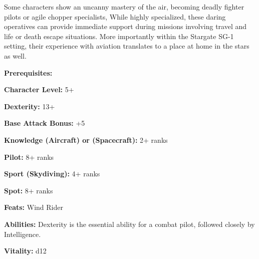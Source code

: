 \begin{multicols}{2}

Some characters show an uncanny mastery of the air, becoming deadly fighter pilots or agile chopper specialists, While highly specialized, these daring operatives can provide immediate support during missions involving travel and life or death escape situations. More importantly within the Stargate SG-1 setting, their experience with aviation translates to a place at home in the stars as well.

\columnbreak

\textbf{Prerequisites:} 
\begin{description*}
\item[\hspace{1.5cm}\textbf{Character Level:}] 5+
\item[\hspace{1.5cm}\textbf{Dexterity:}] 13+
\item[\hspace{1.5cm}\textbf{Base Attack Bonus:}] +5
\item[\hspace{1.5cm}\textbf{Knowledge (Aircraft) or (Spacecraft):}] 2+ ranks
\item[\hspace{1.5cm}\textbf{Pilot:}] 8+ ranks
\item[\hspace{1.5cm}\textbf{Sport (Skydiving):}] 4+ ranks
\item[\hspace{1.5cm}\textbf{Spot:}] 8+ ranks
\item[\hspace{1.5cm}\textbf{Feats:}] Wind Rider
\end{description*}

\textbf{Abilities:} Dexterity is the essential ability for a combat pilot, followed closely by Intelligence.

\textbf{Vitality:} d12

\end{multicols}

\setlength{\intextsep}{-3cm}

